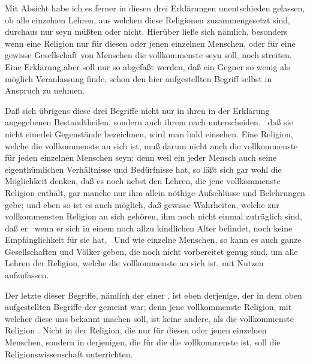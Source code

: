 \begin{aufza}
\item Mit Absicht habe ich es ferner in diesen drei Erklärungen unentschieden gelassen, ob alle einzelnen Lehren, aus welchen diese Religionen zusammengesetzt sind, durchaus nur  seyn müßten oder nicht. Hierüber ließe sich nämlich, besonders wenn eine Religion nur für diesen oder jenen einzelnen Menschen, oder für eine gewisse Gesellschaft von Menschen die vollkommenste seyn soll, noch streiten. Eine Erklärung aber soll nur so abgefaßt werden, daß ein Gegner so wenig als möglich Veranlassung finde, schon den hier aufgestellten Begriff selbst in Anspruch zu nehmen.
\item Daß sich übrigens diese drei Begriffe nicht nur in ihren in der Erklärung angegebenen Bestandtheilen, sondern auch ihrem  nach unterscheiden, \dh\ daß sie nicht einerlei Gegenstände bezeichnen, wird man bald einsehen. Eine Religion, welche die vollkommenste an sich ist, muß darum nicht auch die vollkommenste für jeden einzelnen Menschen seyn; denn weil ein jeder Mensch auch seine eigenthümlichen Verhältnisse und Bedürfnisse hat, so läßt sich gar wohl die Möglichkeit denken, daß es noch nebst den Lehren, die jene vollkommenste Religion enthält, gar manche nur ihm allein nöthige Aufschlüsse und Belehrungen gebe; und eben so ist es auch möglich, daß gewisse Wahrheiten, welche zur vollkommensten Religion an sich gehören, ihm noch nicht einmal zuträglich sind, daß er \zB\ wenn er sich in einem noch allzu kindlichen Alter befindet, noch keine Empfänglichkeit für sie hat, \udgl\ Und wie einzelne Menschen, so kann es auch ganze Gesellschaften und Völker geben, die noch nicht vorbereitet genug sind, um alle Lehren der Religion, welche die vollkommenste an sich ist, mit Nutzen aufzufassen.
\item Der letzte dieser Begriffe, nämlich der einer , ist eben derjenige, der in dem oben aufgestellten Begriffe der  gemeint war; denn jene vollkommenste Religion, mit welcher diese uns bekannt machen soll, ist keine andere, als die vollkommenste Religion . Nicht in der Religion, die nur für diesen oder jenen einzelnen Menschen, sondern in derjenigen, die für die  die vollkommenste ist, soll die Religionswissenschaft unterrichten.~
\end{aufza}

